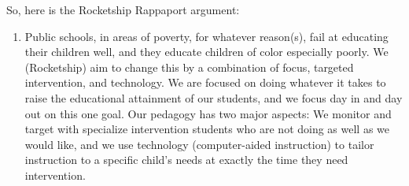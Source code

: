 So, here is the Rocketship Rappaport argument:
\begin{enumerate}[topsep=0.3\baselineskip,itemsep=0.25\baselineskip]
  \item Public schools, in areas of poverty, for whatever reason(s), fail at educating their children well, and they educate children of color especially poorly. We (Rocketship) aim to change this by a combination of focus, targeted intervention, and technology. We are focused on doing whatever it takes to raise the educational attainment of our students, and we focus day in and day out on this one goal. Our pedagogy has two major aspects: We monitor and target with specialize intervention students who are not doing as well as we would like, and we use technology (computer-aided instruction) to tailor instruction to a specific child's needs at exactly the time they need intervention.
  

\end{enumerate}
